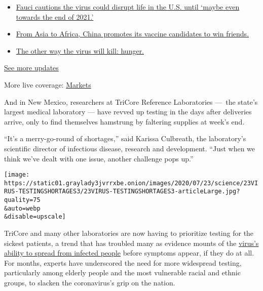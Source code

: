 \begin{itemize}
\tightlist
\item
  \href{https://www.nytimes3xbfgragh.onion/2020/09/11/world/covid-19-coronavirus.html?action=click\&pgtype=Article\&state=default\&region=MAIN_CONTENT_1\&context=storylines_live_updates\#link-dfb8a16}{Fauci
  cautions the virus could disrupt life in the U.S. until `maybe even
  towards the end of 2021.'}
\item
  \href{https://www.nytimes3xbfgragh.onion/2020/09/11/world/covid-19-coronavirus.html?action=click\&pgtype=Article\&state=default\&region=MAIN_CONTENT_1\&context=storylines_live_updates\#link-7104d154}{From
  Asia to Africa, China promotes its vaccine candidates to win friends.}
\item
  \href{https://www.nytimes3xbfgragh.onion/2020/09/11/world/covid-19-coronavirus.html?action=click\&pgtype=Article\&state=default\&region=MAIN_CONTENT_1\&context=storylines_live_updates\#link-393ad215}{The
  other way the virus will kill: hunger.}
\end{itemize}

\href{https://www.nytimes3xbfgragh.onion/2020/09/11/world/covid-19-coronavirus.html?action=click\&pgtype=Article\&state=default\&region=MAIN_CONTENT_1\&context=storylines_live_updates}{See
more updates}

More live coverage:
\href{https://www.nytimes3xbfgragh.onion/live/2020/09/11/business/stock-market-today-coronavirus?action=click\&pgtype=Article\&state=default\&region=MAIN_CONTENT_1\&context=storylines_live_updates}{Markets}

And in New Mexico, researchers at TriCore Reference Laboratories ---~the
state's largest medical laboratory --- have revved up testing in the
days after deliveries arrive, only to find themselves hamstrung by
faltering supplies at week's end.

``It's a merry-go-round of shortages,'' said Karissa Culbreath, the
laboratory's scientific director of infectious disease, research and
development. ``Just when we think we've dealt with one issue, another
challenge pops up.''

\texttt{[image: https://static01.graylady3jvrrxbe.onion/images/2020/07/23/science/23VIRUS-TESTINGSHORTAGES3/23VIRUS-TESTINGSHORTAGES3-articleLarge.jpg?quality=75\\\&auto=webp\\\&disable=upscale]}

TriCore and many other laboratories are now having to prioritize testing
for the sickest patients, a trend that has troubled many as evidence
mounts of the
\href{https://www.nytimes3xbfgragh.onion/2020/06/27/world/europe/coronavirus-spread-asymptomatic.html}{virus's
ability to spread from infected people} before symptoms appear, if they
do at all. For months, experts have underscored the need for more
widespread testing, particularly among elderly people and the most
vulnerable racial and ethnic groups, to slacken the coronavirus's grip
on the nation.

